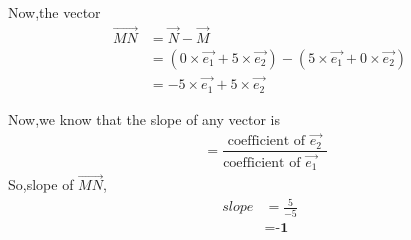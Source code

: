 \documentclass[journal,12pt,twocolumn]{IEEEtran}
\begin{document}
Now,the vector         
\begin{align}
\vec{MN}&=\vec{N}-\vec{M}\\
&=(0\times\vec{e_1}+5\times\vec{e_2})-(5\times\vec{e_1}+0\times\vec{e_2})\\
&=-5\times\vec{e_1}+5\times\vec{e_2}
\end{align}

Now,we know that the slope of any vector is
\begin{align}
    &= \dfrac{\text{coefficient of $\vec{e_2}$}}{\text{coefficient of $\vec{e_1}$ }}
\end{align}
So,slope of $\vec{MN}$,
 \begin{align}
  slope &=\frac{5}{-5}\\
  &=\textbf{-1}             
\end{align}
\end{document}
